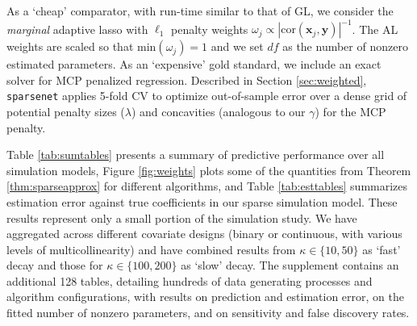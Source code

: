 \documentclass[12pt]{article}
\newcommand{\mr}[1]{\mathrm{#1}}
\newcommand{\bm}[1]{\mathbf{#1}}
\begin{document}
As a `cheap' comparator, with run-time similar to that of GL, we
consider the {\it marginal} adaptive lasso with $\ell_1$ penalty
weights $\omega_j
\propto |\mr{cor}(\bm{x}_j,\bm{y})|^{-1}$.   The AL weights are scaled so that
$\mathrm{min}(\omega_j)=1$ and we set $df$ as
the number of nonzero estimated parameters.   As an `expensive' gold standard,
we include an exact solver for MCP penalized regression. Described in Section \ref{sec:weighted}, {\tt sparsenet} applies 5-fold CV to
optimize out-of-sample error over a dense grid of potential penalty sizes
($\lambda$) and concavities (analogous to our $\gamma$) for the MCP penalty.


Table \ref{tab:sumtables} presents a summary of predictive performance over
all simulation models, Figure \ref{fig:weights}
plots some of the quantities from Theorem \ref{thm:sparseapprox} for different algorithms, and Table \ref{tab:esttables} summarizes estimation error against true coefficients in our sparse simulation model.
These results  represent only a small portion of the simulation
study.  We have aggregated across different covariate designs (binary or
continuous, with various levels of multicollinearity) and have combined
results from $\kappa \in \{10,50\}$ as  `fast' decay and those for $\kappa \in
\{100,200\}$ as `slow' decay.  
The supplement contains an additional
128 tables, detailing hundreds of data generating processes and
algorithm configurations, with results on prediction and estimation error, on the fitted number of nonzero
parameters, and on sensitivity and false discovery rates.
\end{document}
